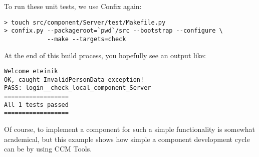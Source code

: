 \vspace{3mm}
To run these unit tests, we use Confix again:
\begin{footnotesize}
\begin{verbatim}
> touch src/component/Server/test/Makefile.py
> confix.py --packageroot=`pwd`/src --bootstrap --configure \
            --make --targets=check 
\end{verbatim}
\end{footnotesize}

At the end of this build process, you hopefully see an output like:
\begin{footnotesize}
\begin{verbatim}
Welcome eteinik
OK, caught InvalidPersonData exception!
PASS: login__check_local_component_Server
==================
All 1 tests passed
==================
\end{verbatim}
\end{footnotesize}

Of course, to implement a component for such a simple functionality is somewhat
academical, but this example shows how simple a component development cycle can
be by using CCM Tools. 

\newpage
